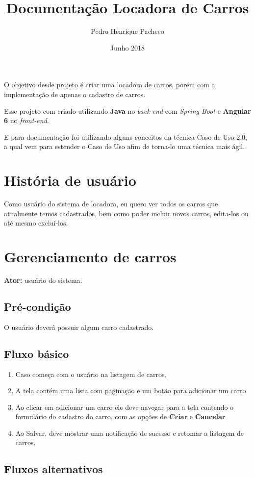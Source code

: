 \documentclass{article}
\title{Documentação Locadora de Carros}
\author{Pedro Henrique Pacheco}
\date{Junho 2018}
\begin{document}
\maketitle

O objetivo desde projeto é criar uma locadora de carros,
porém com a implementação de apenas o cadastro de carros.

Esse projeto com criado utilizando \textbf{Java} no \textit{back-end} com \textit{Spring Boot}
e \textbf{Angular 6} no \textit{front-end}.

E para documentação foi utilizando alguns conceitos da técnica Caso de Uso 2.0,
a qual vem para estender o Caso de Uso afim de torna-lo uma técnica mais ágil.

\section{História de usuário}
Como usuário do sistema de locadora, eu quero ver todos os carros que atualmente temos cadastrados,
bem como poder incluir novos carros, edita-los ou até mesmo excluí-los.

\section{Gerenciamento de carros}
\textbf{Ator:} usuário do sistema.
\subsection{Pré-condição}
O usuário deverá possuir algum carro cadastrado.

\subsection{Fluxo básico}
\begin{enumerate}
    \item Caso começa com o usuário na listagem de carros.
    \item A tela contém uma lista com paginação e um botão para adicionar um carro.
    \item Ao clicar em adicionar um carro ele deve navegar para a tela contendo o formulário do cadastro do carro, com as opções de \textbf{Criar} e \textbf{Cancelar}
    \item Ao Salvar, deve mostrar uma notificação de sucesso e retomar a listagem de carros.    
\end{enumerate}

\subsection{Fluxos alternativos}
\end{document}
